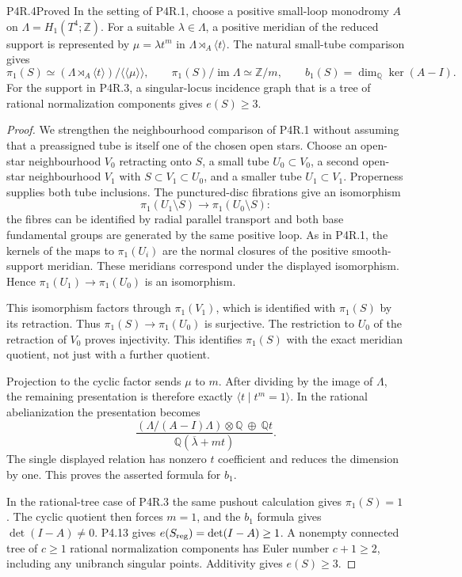 \begin{statement}{P4R.4}{Proved}
In the setting of P4R.1, choose a positive small-loop
monodromy $A$ on $\Lambda=H_1(T^4;\mathbb Z)$.
For a suitable $\lambda\in\Lambda$, a positive
meridian of the reduced support is represented by
$\mu=\lambda t^m$ in $\Lambda\rtimes_A\langle t\rangle$.
The natural small-tube comparison gives
\[
 \pi_1(S)\simeq
 (\Lambda\rtimes_A\langle t\rangle)/\langle\!\langle\mu\rangle\!\rangle,
 \qquad
 \pi_1(S)/\operatorname{im}\Lambda\simeq\mathbb Z/m,
 \qquad
 b_1(S)=\dim_{\mathbb Q}\ker(A-I).
\]
For the support in P4R.3, a singular-locus incidence
graph that is a tree of rational normalization
components gives $e(S)\ge3$.
\end{statement}
\begin{proof}
We strengthen the neighbourhood comparison of P4R.1
without assuming that a preassigned tube is itself
one of the chosen open stars. Choose an open-star
neighbourhood $V_0$ retracting onto $S$, a small tube
$U_0\subset V_0$, a second open-star neighbourhood
$V_1$ with $S\subset V_1\subset U_0$, and a smaller
tube $U_1\subset V_1$. Properness supplies both tube
inclusions. The punctured-disc fibrations give an
isomorphism
\[
 \pi_1(U_1\setminus S)\longrightarrow
 \pi_1(U_0\setminus S):
\]
the fibres can be identified by radial parallel
transport and both base fundamental groups are
generated by the same positive loop. As in P4R.1,
the kernels of the maps to $\pi_1(U_i)$ are the
normal closures of the positive smooth-support
meridian. These meridians correspond under the
displayed isomorphism. Hence
$\pi_1(U_1)\to\pi_1(U_0)$ is an isomorphism.

This isomorphism factors through $\pi_1(V_1)$,
which is identified with $\pi_1(S)$ by its
retraction. Thus $\pi_1(S)\to\pi_1(U_0)$ is
surjective. The restriction to $U_0$ of the
retraction of $V_0$ proves injectivity. This
identifies $\pi_1(S)$ with the exact meridian
quotient, not just with a further quotient.

Projection to the cyclic factor sends $\mu$ to
$m$. After dividing by the image of $\Lambda$,
the remaining presentation is therefore exactly
$\langle t\mid t^m=1\rangle$. In the rational
abelianization the presentation becomes
\[
 \frac{(\Lambda/(A-I)\Lambda)\otimes\mathbb Q
       \ \oplus\ \mathbb Qt}
      {\mathbb Q(\overline\lambda+mt)}.
\]
The single displayed relation has nonzero
$t$ coefficient and reduces the dimension by
one. This proves the asserted formula for $b_1$.

In the rational-tree case of P4R.3 the same
pushout calculation gives $\pi_1(S)=1$.
The cyclic quotient then forces $m=1$, and the
$b_1$ formula gives $\det(I-A)\ne0$.
P4.13 gives
$e(S_{\rm reg})=\det(I-A)\ge1$.
A nonempty connected tree of $c\ge1$ rational
normalization components has Euler number
$c+1\ge2$, including any unibranch singular
points. Additivity gives $e(S)\ge3$.
\end{proof}

